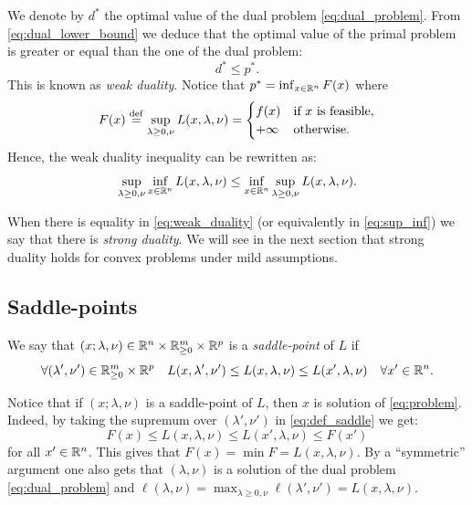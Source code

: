 \documentclass[11pt,nocut]{article}
\begin{document}
We denote by $d^*$ the optimal value of the dual problem \eqref{eq:dual_problem}.
From \eqref{eq:dual_lower_bound} we deduce that the optimal value of the primal problem is greater or equal than the one of the dual problem:
\begin{equation}\label{eq:weak_duality}
	d^* \leq p^*.
\end{equation}
This is known as \emph{weak duality}.
Notice that $p^* = \inf_{x \in \mathbb{R}^n} F(x)$ where
$$
F(x) \overset{\rm def}{=}
\sup_{\lambda \geq 0, \nu} L(x,\lambda,\nu)
=
\begin{cases}
	f(x) & \text{if} \ x \ \text{is feasible},\\
	+ \infty & \text{otherwise.}
\end{cases}
$$
Hence, the weak duality inequality can be rewritten as:
\begin{equation}\label{eq:sup_inf}
	\sup_{\lambda \geq 0, \nu} \inf_{x \in \mathbb{R}^n} L(x,\lambda,\nu) \leq \inf_{x \in \mathbb{R}^n} \sup_{\lambda \geq 0, \nu} L(x,\lambda,\nu).
\end{equation}

When there is equality in \eqref{eq:weak_duality} (or equivalently in \eqref{eq:sup_inf}) we say that there is \emph{strong duality}. We will see in the next section that strong duality holds for convex problems under mild assumptions.


\subsection{Saddle-points}
\begin{definition}
	We say that $(x; \lambda,\nu) \in \mathbb{R}^n \times \mathbb{R}_{\geq 0}^m \times \mathbb{R}^p$ is a \emph{saddle-point} of $L$ if
	\begin{equation}\label{eq:def_saddle}
	\forall (\lambda',\nu') \in \mathbb{R}_{\geq 0}^m \times \mathbb{R}^p \quad
	L(x,\lambda',\nu') \leq L(x,\lambda,\nu) \leq L(x',\lambda,\nu) \quad \forall x' \in \mathbb{R}^n.
\end{equation}
\end{definition}

Notice that if $(x; \lambda,\nu)$ is a saddle-point of $L$, then $x$ is solution of \eqref{eq:problem}. Indeed, by taking the supremum over $(\lambda',\nu')$ in \eqref{eq:def_saddle} we get:
$$
F(x) \leq L(x,\lambda,\nu) \leq L(x',\lambda,\nu) \leq F(x')
$$
for all $x' \in \mathbb{R}^n$. 
This gives that $F(x) = \min F = L(x,\lambda,\nu)$.
By a ``symmetric'' argument one also gets that $(\lambda,\nu)$ is a solution of the dual problem \eqref{eq:dual_problem} and $\ell(\lambda,\nu) = \max_{\lambda \geq 0,\nu} \ell(\lambda',\nu') = L(x,\lambda,\nu)$.
\end{document}
